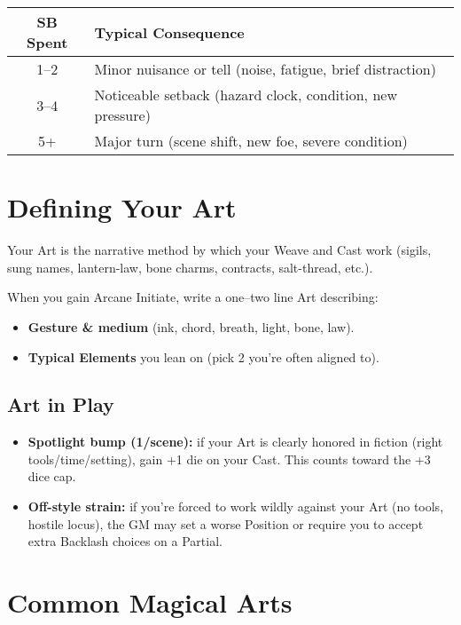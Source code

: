 \begin{center}
\begin{tabular}{cl}
\toprule
\textbf{SB Spent} & \textbf{Typical Consequence} \\
\midrule
1–2 & Minor nuisance or tell (noise, fatigue, brief distraction) \\
3–4 & Noticeable setback (hazard clock, condition, new pressure) \\
5+ & Major turn (scene shift, new foe, severe condition) \\
\bottomrule
\end{tabular}
\end{center}

\section{Defining Your Art}

Your Art is the narrative method by which your Weave and Cast work (sigils, sung names, lantern-law, bone charms, contracts, salt-thread, etc.).

When you gain Arcane Initiate, write a one–two line Art describing:
\begin{itemize}
    \item \textbf{Gesture \& medium} (ink, chord, breath, light, bone, law).
    \item \textbf{Typical Elements} you lean on (pick 2 you're often aligned to).
\end{itemize}

\subsection*{Art in Play}
\begin{itemize}
    \item \textbf{Spotlight bump (1/scene):} if your Art is clearly honored in fiction (right tools/time/setting), gain +1 die on your Cast. This counts toward the +3 dice cap.
    \item \textbf{Off-style strain:} if you're forced to work wildly against your Art (no tools, hostile locus), the GM may set a worse Position or require you to accept extra Backlash choices on a Partial.
\end{itemize}

\section{Common Magical Arts}

